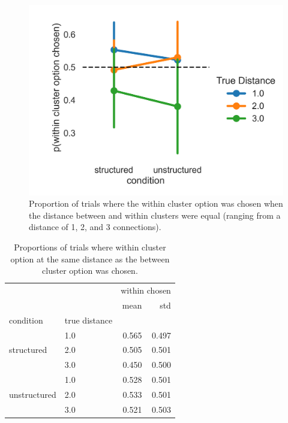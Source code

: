 \begin{figure}
    \centering
    \label{fig:exp3-choice-results}
    \includegraphics[width = \textwidth]{chapter_notebooks/chapter_3/figures/exp3_choice_results.png}
    \caption{Proportion of trials where the within cluster option was chosen when the distance between and within clusters were equal (ranging from a distance of 1, 2, and 3 connections).}
\end{figure}

\begin{table}
    \centering
    \label{tab:exp3-choice-stats}
    \begin{tabular}{llrr}
        \toprule
         &  & \multicolumn{2}{r}{within chosen} \\
         &  & mean & std \\
        condition & true distance &  &  \\
        \midrule
        \multirow[t]{3}{*}{structured} & 1.0 & 0.565 & 0.497 \\
         & 2.0 & 0.505 & 0.501 \\
         & 3.0 & 0.450 & 0.500 \\
        \cline{1-4}
        \multirow[t]{3}{*}{unstructured} & 1.0 & 0.528 & 0.501 \\
         & 2.0 & 0.533 & 0.501 \\
         & 3.0 & 0.521 & 0.503 \\
        \cline{1-4}
        \bottomrule
    \end{tabular}
     \caption{Proportions of trials where within cluster option at the same distance as the between cluster option was chosen.}   
\end{table}


